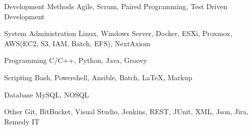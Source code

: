 
\begin{cvskills}

  \cvskill
    {Development Methods} %
    {Agile, Scrum, Paired Programming, Test Driven Development} %

  \cvskill
    {System Administration} %
    {Linux, Windows Server, Docker, ESXi, Proxmox, AWS(EC2, S3, IAM, Batch, EFS), NextAxiom} %

  \cvskill
    {Programming} %
    {C/C++, Python, Java, Groovy} %

  \cvskill
    {Scripting} %
    {Bash, Powershell, Ansible, Batch, LaTeX, Markup} %

    
  \cvskill
    {Database} %
    {MySQL, NOSQL} %
    
  \cvskill
    {Other} %
    {Git, BitBucket, Visual Studio, Jenkins, REST, JUnit, XML, Json, Jira, Remedy IT} %
    
\end{cvskills}
